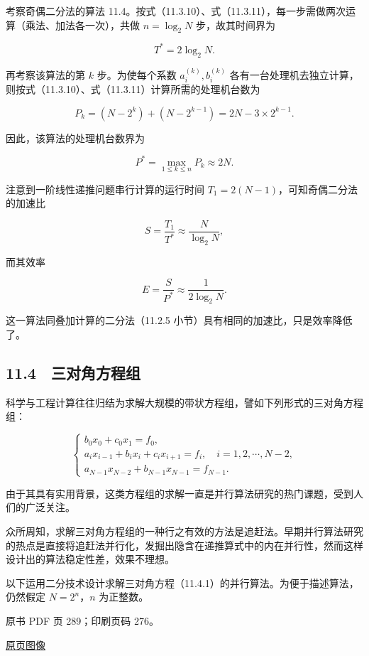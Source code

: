 考察奇偶二分法的算法 11.4。按式（11.3.10）、式（11.3.11），每一步需做两次运算（乘法、加法各一次），共做 \(n=\log_2 N\) 步，故其时间界为

\[
T^*=2\log_2 N.
\]

再考察该算法的第 \(k\) 步。为使每个系数 \(a_i^{(k)},b_i^{(k)}\) 各有一台处理机去独立计算，则按式（11.3.10）、式（11.3.11）计算所需的处理机台数为

\[
P_k=(N-2^k)+(N-2^{k-1})=2N-3\times2^{k-1}.
\]

因此，该算法的处理机台数界为

\[
P^*=\max_{1\le k\le n}P_k\approx2N.
\]

注意到一阶线性递推问题串行计算的运行时间 \(T_1=2(N-1)\)，可知奇偶二分法的加速比

\[
S=\frac{T_1}{T^*}\approx\frac{N}{\log_2 N},
\]

而其效率

\[
E=\frac{S}{P^*}\approx\frac{1}{2\log_2 N}.
\]

这一算法同叠加计算的二分法（11.2.5 小节）具有相同的加速比，只是效率降低了。

\subsection{11.4　三对角方程组}\label{ch11-ux4e09ux5bf9ux89d2ux65b9ux7a0bux7ec4}

科学与工程计算往往归结为求解大规模的带状方程组，譬如下列形式的三对角方程组：

\[
\begin{cases}
b_0x_0+c_0x_1=f_0,\\
a_ix_{i-1}+b_ix_i+c_ix_{i+1}=f_i,\quad i=1,2,\cdots,N-2,\\
a_{N-1}x_{N-2}+b_{N-1}x_{N-1}=f_{N-1}.
\end{cases}
\tag{11.4.1}
\]

由于其具有实用背景，这类方程组的求解一直是并行算法研究的热门课题，受到人们的广泛关注。

众所周知，求解三对角方程组的一种行之有效的方法是追赶法。早期并行算法研究的热点是直接将追赶法并行化，发掘出隐含在递推算式中的内在并行性，然而这样设计出的算法稳定性差，效果不理想。

以下运用二分技术设计求解三对角方程（11.4.1）的并行算法。为便于描述算法，仍然假定 \(N=2^n\)，\(n\) 为正整数。

\clearpage

原书 PDF 页 289；印刷页码 276。

\href{source-images/pdf-289.jpeg}{原页图像}

